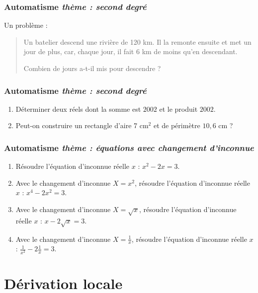 \documentclass[11pt]{beamer}
\newcounter{autocompteur}
\newcommand{\automatisme}[1]{\addtocounter{autocompteur}{1}\frametitle{Automatisme  \theautocompteur  \textit{ thème : #1}}}
\begin{document}
\begin{frame}
\automatisme{second degré}

Un problème :

{\itshape 
\begin{quote}
Un batelier descend une rivière de 120 km. Il la remonte ensuite et met un jour de plus, car, chaque jour, il fait 6 km de moins qu'en descendant.

Combien de jours a-t-il mis pour descendre ?


\end{quote}

}
\end{frame}



\begin{frame}
\automatisme{second degré}

\begin{enumerate}
\item Déterminer deux réels dont la somme est $2002$ et le produit $2002$.
\item Peut-on construire un rectangle d'aire 7 cm$^{2}$ et de périmètre $10,6$ cm ?
\end{enumerate}
\end{frame}



\begin{frame}
\automatisme{équations avec changement d'inconnue}

\begin{enumerate}
\item Résoudre l'équation d'inconnue réelle $x$ :  $x^{2}-2x= 3$.
\item Avec le changement d'inconnue $X=x^2$, résoudre l'équation d'inconnue réelle $x$ :  $x^{4}-2x^{2}= 3$.
\item Avec le changement d'inconnue $X=\sqrt{x}$, résoudre l'équation d'inconnue réelle $x$ :  $x-2\sqrt{x}= 3$.
\item Avec le changement d'inconnue $X=\frac{1}{x}$, résoudre l'équation d'inconnue réelle $x$ :  $\frac{1}{x^{2}}-2\frac{1}{x}= 3$.
\end{enumerate}
\end{frame}




\section{Dérivation locale}


\label{derivationlocale}
\end{document}
